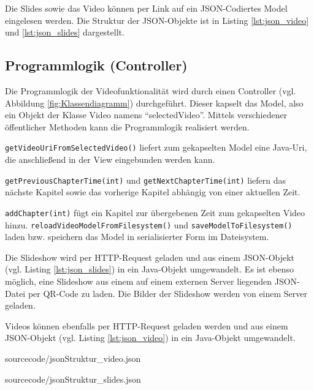 Die Slides sowie das Video können per Link auf ein JSON-Codiertes Model eingelesen werden. Die Struktur der JSON-Objekte ist in Listing \ref{lst:json_video} und \ref{lst:json_slides} dargestellt.
%
%
\subsection{Programmlogik (Controller)}
Die Programmlogik der Videofunktionalität wird durch einen Controller (vgl. Abbildung \ref{fig:Klassendiagramm}) durchgeführt. Dieser kapselt das Model, also ein Objekt der Klasse Video namens \enquote{selectedVideo}. Mittels verschiedener öffentlicher Methoden kann die Programmlogik realisiert werden. 

\texttt{getVideoUriFromSelectedVideo()} liefert zum gekapselten Model eine Java-Uri, die anschließend in der View eingebunden werden kann.

\texttt{getPreviousChapterTime(int)} und \texttt{getNextChapterTime(int)} liefern das nächste Kapitel sowie das vorherige Kapitel abhängig von einer aktuellen Zeit. 

\texttt{addChapter(int)} fügt ein Kapitel zur übergebenen Zeit zum gekapselten Video hinzu. 
\texttt{reloadVideoModelFromFilesystem()} und \texttt{saveModelToFilesystem()} laden bzw. speichern das Model in serialisierter Form im Dateisystem.

Die Slideshow wird per HTTP-Request geladen und aus einem JSON-Objekt (vgl. Listing \ref{lst:json_slides}) in ein Java-Objekt umgewandelt. Es ist ebenso möglich, eine Slideshow aus einem auf einem externen Server liegenden JSON-Datei per QR-Code zu laden. Die Bilder der Slideshow werden von einem Server geladen.

Videos können ebenfalls per HTTP-Request geladen werden und aus einem JSON-Objekt (vgl. Listing \ref{lst:json_video}) in ein Java-Objekt umgewandelt. 

\begin{minipage}{\linewidth}
\begin{lstinputlisting}[%
    caption={JSON-Struktur des Videos},%
    captionpos=b, %
    label={lst:json_video},%
    language=json,%
    firstnumber=1, %
    basicstyle=\scriptsize, %
    breaklines=true]
{sourcecode/jsonStruktur_video.json}
\end{lstinputlisting}
\end{minipage}
%
\begin{minipage}{\linewidth}
\begin{lstinputlisting}[%
    caption={JSON-Struktur der Slides},%
    captionpos=b, %
    label={lst:json_slides},%
    language=json,%
    firstnumber=1, %
    basicstyle=\scriptsize, %
    breaklines=true]
{sourcecode/jsonStruktur_slides.json}
\end{lstinputlisting}
\end{minipage}